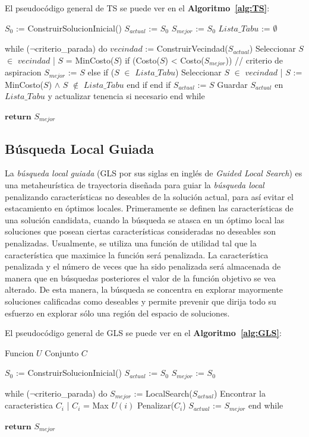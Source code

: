 El pseudocódigo general de TS se puede ver en el \textbf{Algoritmo~\ref{alg:TS}}:

\begin{code}[includerangemarker=false,frame=single,label=alg:TS,caption=Pseudocódigo de Búsqueda Tabú,firstnumber=100, mathescape]
$S_0$ := ConstruirSolucionInicial()
$S_{actual}$ := $S_0$
$S_{mejor}$ := $S_0$
$Lista\_Tabu$ := $\emptyset$

while ($\neg$criterio_parada) do
	$vecindad$ := ConstruirVecindad($S_{actual}$)
	Seleccionar $S$ $\in$ $vecindad$ | $S$ = Min{Costo($S$)}
	if (Costo($S$) < Costo($S_{mejor}$))	        // criterio de aspiracion
		$S_{mejor}$ := $S$
	else
		if ($S$ $\in$ $Lista\_Tabu$)
			Seleccionar $S$ $\in$ $vecindad$ | $S$ := Min{Costo($S$)} $\wedge$ $S$ $\notin$ $Lista\_Tabu$
		end if
	end if
	$S_{actual}$ := $S$
	Guardar $S_{actual}$ en $Lista\_Tabu$ y actualizar tenencia si necesario
end while

$\textbf{return}$ $S_{mejor}$
\end{code}

\subsection{Búsqueda Local Guiada} \label{subsect:gls}

La \emph{búsqueda local guiada} (GLS por sus siglas en inglés de \emph{Guided Local Search}) es una metaheurística de trayectoria diseñada para guiar la \emph{búsqueda local} penalizando características no deseables de la solución actual, para así evitar el estacamiento en óptimos locales. Primeramente se definen las características de una solución candidata, cuando la búsqueda se atasca en un óptimo local las soluciones que posean  ciertas características consideradas no deseables son penalizadas. Usualmente, se utiliza una función de utilidad tal que la característica que maximice la función será penalizada. La característica penalizada y el número de veces que ha sido penalizada será almacenada de manera que en búsquedas posteriores el valor de la función objetivo se vea alterado. De esta manera, la búsqueda se concentra en explorar mayormente soluciones calificadas como deseables y permite prevenir que dirija todo su esfuerzo en explorar sólo una región del espacio de soluciones.

El pseudocódigo general de GLS se puede ver en el \textbf{Algoritmo~\ref{alg:GLS}}:

\begin{code}[includerangemarker=false,frame=single,label=alg:GLS,caption=Pseudocódigo de Búsqueda Local Guiada,firstnumber=100, mathescape]
Funcion $U$
Conjunto $C$

$S_0$ := ConstruirSolucionInicial()
$S_{actual}$ := $S_0$
$S_{mejor}$ := $S_0$

while ($\neg$criterio_parada) do
	$S_{mejor}$ := LocalSearch($S_{actual}$)
	Encontrar la caracteristica $C_i$ | $C_i$ = Max {$U(i)$}
	Penalizar($C_i$)
	$S_{actual}$ := $S_{mejor}$
end while

$\textbf{return}$ $S_{mejor}$
\end{code}

